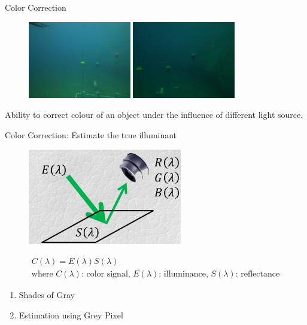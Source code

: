 \documentclass[13pt]{beamer}
\begin{document}
\begin{frame}{Color Correction}
    \begin{figure}
        \centering
        \includegraphics[width=0.4\textwidth, height=0.3\textheight]{figs/problem1_1.png}\hspace{2em}
        \includegraphics[width=0.4\textwidth, height=0.3\textheight]{figs/problem1_2.jpg}
    \end{figure}

    Ability to correct colour of an object under the influence of different
    light source.

\end{frame}

\begin{frame}{Color Correction: Estimate the true illuminant}

  \begin{figure}[ht]
      \centering
      \includegraphics[width=0.6\textwidth, height=0.3\textwidth]{figs/lambertian.png}
  \end{figure}

  \begin{gather*}
    C(\lambda) = E(\lambda)S(\lambda) \\         \text{where~$C(\lambda)$:
      color signal, $E(\lambda)$: illuminance, $S(\lambda)$: reflectance}
  \end{gather*}

  \begin{enumerate}
    \item Shades of Gray
    \item Estimation using Grey Pixel
  \end{enumerate}
\end{frame}
\end{document}
